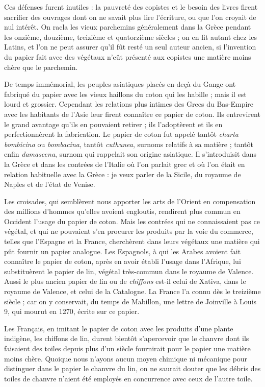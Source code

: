 \documentclass[a4paper, 11pt, oneside, polutonikogreek]{article}
\begin{document}
Ces défenses furent inutiles : la pauvreté des copistes et le besoin des livres firent sacrifier des ouvrages dont on ne savait plus lire l'écriture, ou que l'on croyait de nul intérêt. On racla les vieux parchemins généralement dans la Grèce pendant les onzième, douzième, treizième et quatorzième siècles ; on en fit autant chez les Latins, et l'on ne peut assurer qu'il fût resté un seul auteur ancien, si l'invention du papier fait avec des végétaux n'eût présenté aux copistes une matière moins chère que le parchemin.

De temps immémorial, les peuples asiatiques placés en-deçà du Gange ont fabriqué du papier avec les vieux haillons du coton qui les habille ; mais il est lourd et grossier. Cependant les relations plus intimes des Grecs du Bas-Empire avec les habitants de l'Asie leur firent connaître ce papier de coton. Ils entrevirent le grand avantage qu'ils en pouvaient retirer ; ils l'adoptèrent et ils en perfectionnèrent la fabrication. Le papier de coton fut appelé tantôt \emph{charta bombicina} ou \emph{bombacina}, tantôt \emph{cuthunea}, surnoms relatifs à sa matière ; tantôt enfin \emph{damascena}, surnom qui rappelait son origine asiatique. Il s'introduisit dans la Grèce et dans les contrées de l'Italie où l'on parlait grec et où l'on était en relation habituelle avec la Grèce : je veux parler de la Sicile, du royaume de Naples et de l'état de Venise.

Les croisades, qui semblèrent nous apporter les arts de l'Orient en compensation des millions d'hommes qu'elles avoient engloutis, rendirent plus commun en Occident l'usage du papier de coton. Mais les contrées qui ne connaissaient pas ce végétal, et qui ne pouvaient s'en procurer les produits par la voie du commerce, telles que l'Espagne et la France, cherchèrent dans leurs végétaux une matière qui pût fournir un papier analogue. Les Espagnols, à qui les Arabes avoient fait connaître le papier de coton, après en avoir établi l'usage dans l'Afrique, lui substituèrent le papier de lin, végétal très-commun dans le royaume de Valence. Aussi le plus ancien papier de lin ou de \emph{chiffons} est-il celui de Xativa, dans le royaume de Valence, et celui de la Catalogne. La France l'a connu dès le treizième siècle ; car on y conservait, du temps de Mabillon, une lettre de Joinville à Louis 9, qui mourut en 1270, écrite sur ce papier.

Les Français, en imitant le papier de coton avec les produits d'une plante indigène, les chiffons de lin, durent bientôt s'apercevoir que le chanvre dont ils faisaient des toiles depuis plus d'un siècle fournirait pour le papier une matière moins chère. Quoique nous n'ayons aucun moyen chimique ni mécanique pour distinguer dans le papier le chanvre du lin, on ne saurait douter que les débris des toiles de chanvre n'aient été employés en concurrence avec ceux de l'autre toile.
\end{document}
